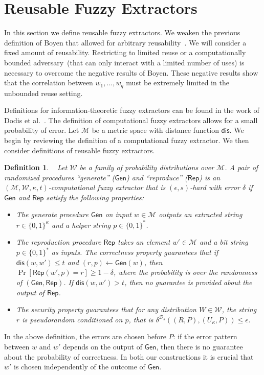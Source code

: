 \documentclass[11pt]{article}
\newcommand{\class}[1]{{\ensuremath{\mathsf{#1}}}}
\newcommand{\gen}{\ensuremath{\class{Gen}}\xspace}
\newcommand{\rep}{\ensuremath{\class{Rep}}\xspace}
\newcommand{\dis}{\ensuremath{\mathsf{dis}}}
\newtheorem{definition}[theorem]{Definition}
\begin{document}
\section{Reusable Fuzzy Extractors}
\label{sec:fuzzy extractors}

In this section we define reusable fuzzy extractors.  We weaken the previous definition of Boyen that allowed for arbitrary reusability~\cite[Definitions 6 and 7]{Boyen2004}.  We will consider a fixed amount of reusability.  Restricting to limited reuse or a computationally bounded adversary~(that can only interact with a limited number of uses) is necessary to overcome the negative results of Boyen.  These negative results show that the correlation between $w_1,..., w_q$ must be extremely limited in the unbounded reuse setting.

Definitions for information-theoretic fuzzy extractors can be found in the work of Dodis et al.~\cite[Sections 2.5--4.1]{DBLP:journals/siamcomp/DodisORS08}.  The definition of computational fuzzy extractors allows for a small probability of error.  Let $\mathcal{M}$ be a metric space with distance function $\dis$.  We begin by reviewing the definition of a computational fuzzy extractor.  We then consider definitions of reusable fuzzy extractors.

\begin{definition}~\cite[Definition 2.5]{fuller2013computational}
\label{def:comp fuzzy extractor}
Let $\mathcal{W}$ be a family of probability distributions over $\mathcal{M}$. A pair of randomized procedures ``generate'' ($\gen$) and ``reproduce'' ($\rep$) is an $(\mathcal{M}, \mathcal{W}, \kappa, t)$-\emph{computational fuzzy extractor} that is $(\epsilon, s)$-hard with error $\delta$ if \gen and \rep satisfy the following properties:
\begin{itemize}
\item The generate procedure \gen on input $w\in \mathcal{M}$ outputs an extracted string $r\in\{0,1\}^\kappa$ and a helper string $p\in\{0,1\}^*$.
\item The reproduction procedure \rep takes an element $w'\in\mathcal{M}$ and a bit string $p\in\{0,1\}^*$ as inputs.  The \emph{correctness} property guarantees that if $\dis(w, w')\leq t$ and $(r, p)\leftarrow \gen(w)$, then $\Pr[\rep( w', p) = r] \geq 1-\delta$, where the probability is over the randomness of $(\gen, \rep)$.
If $\dis(w, w') > t$, then no guarantee is provided about the output of \rep.
\item The \emph{security} property guarantees that for any distribution $W\in \mathcal{W}$, the string $r$ is pseudorandom conditioned on $p$, that is $\delta^{\mathcal{D}_s}((R, P), (U_\kappa, P))\leq \epsilon$.
\end{itemize}
\end{definition}
In the above definition, the errors are chosen before $P$: if the error pattern between $w$ and $w'$ depends on the output of $\gen$, then there is no guarantee about the probability of correctness. In both our constructions it is crucial that $w'$ is chosen independently of the outcome of \gen.
\end{document}
